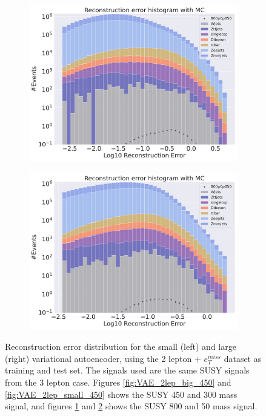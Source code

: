 \begin{figure}[H]
\begin{subfigure}{.45\textwidth}
        \includegraphics[width=\textwidth]{Figures/VAE_testing/big/2lep/b_data_recon_big_rm3_feats_sig_800p0p050_.pdf}
        \caption{}
        \label{fig:VAE_2lep_big_800}
    \end{subfigure}
    \hfill   
    \begin{subfigure}{.45\textwidth}
        \includegraphics[width=\textwidth]{Figures/VAE_testing/small/2lep/b_data_recon_big_rm3_feats_sig_800p0p050_.pdf}
        \caption{}
        \label{fig:VAE_2lep_small_800}
    \end{subfigure}
    \hfill      
    \caption[2lep reconstruction error with SUSY signals for VAE]{Reconstruction error distribution for the small (left) and large (right)
    variational autoencoder, using the 2 lepton + $e_T^{miss}$ dataset as training and test set. The signals used are the same SUSY signals 
    from the 3 lepton case. Figures \ref{fig:VAE_2lep_big_450} and \ref{fig:VAE_2lep_small_450} shows the SUSY 450 and 300 mass signal, 
    and figures \ref{fig:VAE_2lep_big_800} and \ref{fig:VAE_2lep_small_800} shows the SUSY 800 and 50 mass signal.}
    \label{fig:VAE_2lep_recon_err_both_sig}
\end{figure}

